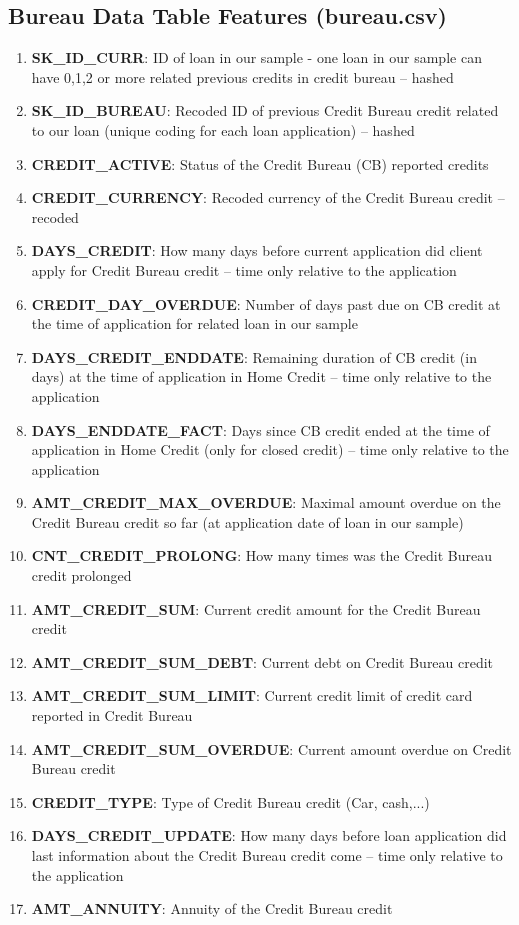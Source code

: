 \documentclass[12pt, letterpaper]{article}
\begin{document}
\begin{appendices}
\subsection{Bureau Data Table Features (bureau.csv)}
\begin{enumerate}
  \item \textbf{SK_ID_CURR}: ID of loan in our sample - one loan in our sample can have 0,1,2 or more related previous credits in credit bureau -- hashed
  \item \textbf{SK_ID_BUREAU}: Recoded ID of previous Credit Bureau credit related to our loan (unique coding for each loan application) -- hashed
  \item \textbf{CREDIT_ACTIVE}: Status of the Credit Bureau (CB) reported credits
  \item \textbf{CREDIT_CURRENCY}: Recoded currency of the Credit Bureau credit -- recoded
  \item \textbf{DAYS_CREDIT}: How many days before current application did client apply for Credit Bureau credit -- time only relative to the application
  \item \textbf{CREDIT_DAY_OVERDUE}: Number of days past due on CB credit at the time of application for related loan in our sample
  \item \textbf{DAYS_CREDIT_ENDDATE}: Remaining duration of CB credit (in days) at the time of application in Home Credit -- time only relative to the application
  \item \textbf{DAYS_ENDDATE_FACT}: Days since CB credit ended at the time of application in Home Credit (only for closed credit) -- time only relative to the application
  \item \textbf{AMT_CREDIT_MAX_OVERDUE}: Maximal amount overdue on the Credit Bureau credit so far (at application date of loan in our sample)
  \item \textbf{CNT_CREDIT_PROLONG}: How many times was the Credit Bureau credit prolonged
  \item \textbf{AMT_CREDIT_SUM}: Current credit amount for the Credit Bureau credit
  \item \textbf{AMT_CREDIT_SUM_DEBT}: Current debt on Credit Bureau credit
  \item \textbf{AMT_CREDIT_SUM_LIMIT}: Current credit limit of credit card reported in Credit Bureau
  \item \textbf{AMT_CREDIT_SUM_OVERDUE}: Current amount overdue on Credit Bureau credit
  \item \textbf{CREDIT_TYPE}: Type of Credit Bureau credit (Car, cash,...)
  \item \textbf{DAYS_CREDIT_UPDATE}: How many days before loan application did last information about the Credit Bureau credit come -- time only relative to the application
  \item \textbf{AMT_ANNUITY}: Annuity of the Credit Bureau credit
\end{enumerate}


\end{appendices}
\end{document}
